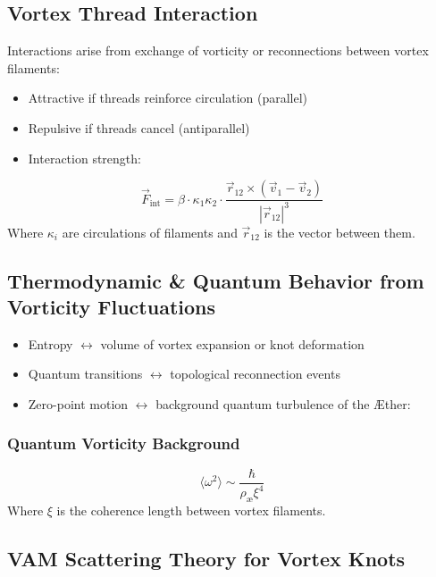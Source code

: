 \subsection{Vortex Thread Interaction}
Interactions arise from exchange of vorticity or reconnections between vortex filaments:
\begin{itemize}
    \item Attractive if threads reinforce circulation (parallel)
    \item Repulsive if threads cancel (antiparallel)
    \item Interaction strength:
\end{itemize}
\begin{equation}
    \vec{F}_{\text{int}} = \beta \cdot \kappa_1 \kappa_2 \cdot \frac{\vec{r}_{12} \times (\vec{v}_1 - \vec{v}_2)}{|\vec{r}_{12}|^3}\label{eq:interaction_strength}
\end{equation}
Where \(\kappa_i\) are circulations of filaments and \(\vec{r}_{12}\) is the vector between them.

\subsection{Thermodynamic \& Quantum Behavior from Vorticity Fluctuations}
\begin{itemize}
    \item Entropy \(\leftrightarrow\) volume of vortex expansion or knot deformation
    \item Quantum transitions \(\leftrightarrow\) topological reconnection events
    \item Zero-point motion \(\leftrightarrow\) background quantum turbulence of the Æther:
\end{itemize}

\subsubsection*{Quantum Vorticity Background}
\begin{equation}
    \langle \omega^2 \rangle \sim \frac{\hbar}{\rho_\text{æ} \xi^4}\label{eq:quantum_vorticity_background}
\end{equation}
Where \(\xi\) is the coherence length between vortex filaments.

\subsection{VAM Scattering Theory for Vortex Knots}

